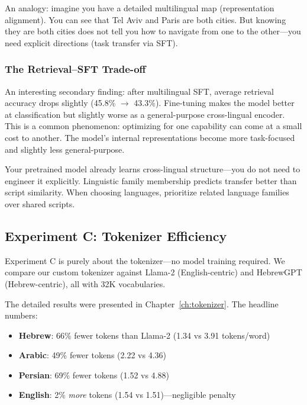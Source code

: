 \documentclass[11pt,a4paper]{article}
\begin{document}
An analogy: imagine you have a detailed multilingual map (representation alignment). You can see that Tel Aviv and Paris are both cities. But knowing they are both cities does not tell you how to navigate from one to the other---you need explicit directions (task transfer via SFT).

\subsubsection{The Retrieval--SFT Trade-off}

An interesting secondary finding: after multilingual SFT, average retrieval accuracy drops slightly (45.8\% $\rightarrow$ 43.3\%). Fine-tuning makes the model better at classification but slightly worse as a general-purpose cross-lingual encoder. This is a common phenomenon: optimizing for one capability can come at a small cost to another. The model's internal representations become more task-focused and slightly less general-purpose.

\begin{tip}[title={Builder Takeaway}]
Your pretrained model already learns cross-lingual structure---you do not need to engineer it explicitly. Linguistic family membership predicts transfer better than script similarity. When choosing languages, prioritize related language families over shared scripts.
\end{tip}

\subsection{Experiment C: Tokenizer Efficiency}

Experiment C is purely about the tokenizer---no model training required. We compare our custom tokenizer against Llama-2 (English-centric) and HebrewGPT (Hebrew-centric), all with 32K vocabularies.

The detailed results were presented in Chapter~\ref{ch:tokenizer}. The headline numbers:

\begin{itemize}
    \item \textbf{Hebrew}: 66\% fewer tokens than Llama-2 (1.34 vs 3.91 tokens/word)
    \item \textbf{Arabic}: 49\% fewer tokens (2.22 vs 4.36)
    \item \textbf{Persian}: 69\% fewer tokens (1.52 vs 4.88)
    \item \textbf{English}: 2\% \emph{more} tokens (1.54 vs 1.51)---negligible penalty
\end{itemize}
\end{document}
